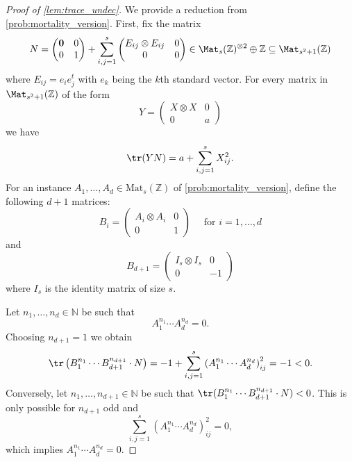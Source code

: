\begin{proof}[Proof of \cref{lem:trace_undec}]
We provide a reduction from \cref{prob:mortality_version}.
First, fix the matrix 
$$ N = \begin{pmatrix} \mathbf{0} & 0 \\ 0 & 1 \end{pmatrix} + \sum_{i,j = 1}^{s} \begin{pmatrix} E_{ij} \otimes E_{ij} & 0 \\ 0 & 0\end{pmatrix} \in \Mat_{s}(\mathbb{Z})^{\otimes 2} \oplus \mathbb{Z} \subseteq  \Mat_{s^2 + 1}(\mathbb{Z})$$
where $E_{ij} = e_{i} e_{j}^t$ with $e_k$ being the $k$th standard vector. For every matrix in $\Mat_{s^2 + 1}(\mathbb{Z})$ of the form
$$Y = \begin{pmatrix} X \otimes X & 0 \\ 0 & a \end{pmatrix}$$
we have 
$$ \tr(YN) = a + \sum_{i,j = 1}^{s} X_{ij}^2.$$
For an instance $A_1, \ldots, A_d \in \mathrm{Mat}_s(\mathbb{Z})$ of \cref{prob:mortality_version}, define the following $d+1$ matrices:
$$B_i = \begin{pmatrix}
A_i \otimes A_i & 0 \\ 0 & 1
\end{pmatrix} \quad \text{ for } i = 1, \ldots, d$$
and
$$B_{d+1} = \begin{pmatrix} I_{s}\otimes I_s & 0 \\ 0 & -1 \end{pmatrix}$$
where $I_s$ is the identity matrix of size $s$.

Let $n_1, \ldots, n_d \in \mathbb{N}$ be such that 
$$A_1^{n_1} \cdots A_d^{n_d} = 0.$$
Choosing $n_{d+1}=1$ we obtain
$$\tr\left(B_1^{n_1} \cdots B_{d+1}^{n_{d+1}} \cdot N\right) = -1 + \sum_{i,j = 1}^{s} \left(A_1^{n_1} \cdots A_d^{n_d}\right)_{ij}^2 = -1 < 0.$$
Conversely, let $n_1, \ldots, n_{d+1} \in \mathbb{N}$ be such that $\tr(B_1^{n_1} \cdots B_{d+1}^{n_{d+1}} \cdot N)  < 0$. This is only possible for $n_{d+1}$ odd  and 
$$\sum_{i,j = 1}^{s} \left(A_1^{n_1} \cdots A_d^{n_d}\right)_{ij}^2 = 0,$$
which implies  $A_1^{n_1} \cdots A_d^{n_d} = 0$.
\end{proof}




